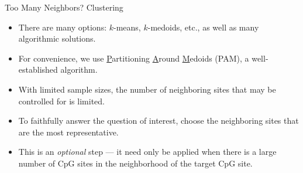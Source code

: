\documentclass[12pt,t,handout]{beamer}
\begin{document}
\begin{frame}[c]{Too Many Neighbors? Clustering}

\begin{center}
\begin{itemize}
  \itemsep10pt
  \item There are many options: $k$-means, $k$-medoids, etc., as well as many
    algorithmic solutions.
  \item For convenience, we use \underline{P}artitioning \underline{A}round
    \underline{M}edoids (PAM), a well-established algorithm.
  \item With limited sample sizes, the number of neighboring sites that may be
    controlled for is limited.
  \item To faithfully answer the question of interest, choose the neighboring
    sites that are the most representative.
  \item This is an \textit{optional} step --- it need only be applied when there
    is a large number of CpG sites in the neighborhood of the target CpG site.
\end{itemize}
\end{center}


\end{frame}

\end{document}
